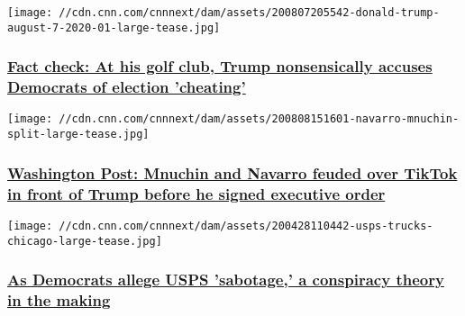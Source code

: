 \href{/2020/08/07/politics/donald-trump-press-briefing-democrats-cheating-election-fact-check/index.html}{}

\texttt{[image: //cdn.cnn.com/cnnnext/dam/assets/200807205542-donald-trump-august-7-2020-01-large-tease.jpg]}

\hypertarget{fact-check-at-his-golf-club-trump-nonsensically-accuses-democrats-of-election-cheating-}{%
\subsubsection{\texorpdfstring{\href{/2020/08/07/politics/donald-trump-press-briefing-democrats-cheating-election-fact-check/index.html}{Fact
check: At his golf club, Trump nonsensically accuses Democrats of
election 'cheating'
}}{Fact check: At his golf club, Trump nonsensically accuses Democrats of election 'cheating' }}\label{fact-check-at-his-golf-club-trump-nonsensically-accuses-democrats-of-election-cheating-}}

\href{/2020/08/08/politics/mnuchin-navarro-tiktok/index.html}{}

\texttt{[image: //cdn.cnn.com/cnnnext/dam/assets/200808151601-navarro-mnuchin-split-large-tease.jpg]}

\hypertarget{washington-post-mnuchin-and-navarro-feuded-over-tiktok-in-front-of-trump-before-he-signed-executive-order}{%
\subsubsection{\texorpdfstring{\href{/2020/08/08/politics/mnuchin-navarro-tiktok/index.html}{Washington
Post: Mnuchin and Navarro feuded over TikTok in front of Trump before he
signed executive
order}}{Washington Post: Mnuchin and Navarro feuded over TikTok in front of Trump before he signed executive order}}\label{washington-post-mnuchin-and-navarro-feuded-over-tiktok-in-front-of-trump-before-he-signed-executive-order}}

\href{/2020/08/08/politics/usps-postal-service-democrats-allegations-sabotage/index.html}{}

\texttt{[image: //cdn.cnn.com/cnnnext/dam/assets/200428110442-usps-trucks-chicago-large-tease.jpg]}

\hypertarget{as-democrats-allege-usps-sabotage-a-conspiracy-theory-in-the-making}{%
\subsubsection{\texorpdfstring{\href{/2020/08/08/politics/usps-postal-service-democrats-allegations-sabotage/index.html}{As
Democrats allege USPS 'sabotage,' a conspiracy theory in the
making}}{As Democrats allege USPS 'sabotage,' a conspiracy theory in the making}}\label{as-democrats-allege-usps-sabotage-a-conspiracy-theory-in-the-making}}

